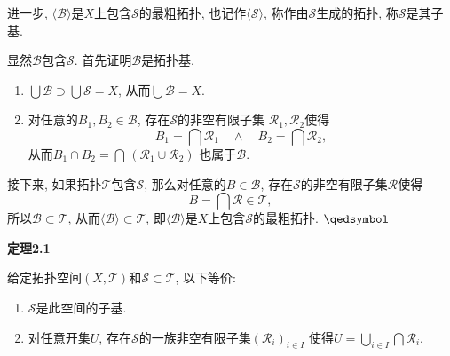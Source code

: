 \documentclass[UTF8]{ctexart}
\begin{document}
进一步, $\langle\mathcal{B}\rangle$是$X$上包含$\mathcal{S}$的最粗拓扑,
也记作$\langle\mathcal{S}\rangle$, 称作由$\mathcal{S}$生成的拓扑,
称$\mathcal{S}$是其子基.


显然$\mathcal{B}$包含$\mathcal{S}$. 首先证明$\mathcal{B}$是拓扑基.


\begin{enumerate}
    \item $\displaystyle\bigcup\mathcal{B}\supset\bigcup\mathcal{S}=X$,
    从而$\displaystyle\bigcup\mathcal{B}=X$.
    \vspace{3pt}
    \item 对任意的$B_1,B_2\in\mathcal{B}$, 存在$\mathcal{S}$的非空有限子集
    $\mathcal{R}_1,\mathcal{R}_2$使得
    \[
        B_1=\bigcap\mathcal{R}_1\quad\land\quad B_2=\bigcap\mathcal{R}_2,
    \]
    从而$\displaystyle B_1\cap B_2=\bigcap\,(\mathcal{R}_1\cup\mathcal{R}_2)$
    也属于$\mathcal{B}$.
\end{enumerate}

\vspace{3pt}
接下来, 如果拓扑$\mathcal{T}$包含$\mathcal{S}$,
那么对任意的$B\in\mathcal{B}$, 存在$\mathcal{S}$的非空有限子集$\mathcal{R}$使得
\[
    B=\bigcap\mathcal{R}\in\mathcal{T},
\]
所以$\mathcal{B}\subset\mathcal{T}$,
从而$\langle\mathcal{B}\rangle\subset\mathcal{T}$,
即$\langle\mathcal{B}\rangle$是$X$上包含$\mathcal{S}$的最粗拓扑. \hfill $\qedsymbol$


\vspace{10pt}

\hypertarget{sec:定理2.1}{}
\noindent\textbf{定理2.1}

给定拓扑空间$(X,\mathcal{T})$和$\mathcal{S}\subset\mathcal{T}$, 以下等价:
\begin{enumerate}
    \item $\mathcal{S}$是此空间的子基.
    \vspace{3pt}
    \item 对任意开集$U$, 存在$\mathcal{S}$的一族非空有限子集$(\mathcal{R}_i)_{i\in I}$
    使得$\displaystyle U=\bigcup_{i\in I}\bigcap\mathcal{R}_i$.
\end{enumerate}
\end{document}
